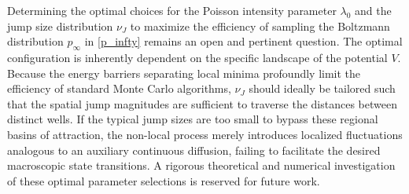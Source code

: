 \begin{remark}
    Determining the optimal choices for the Poisson intensity parameter $\lambda_0$ and the jump size distribution $\nu_J$ to maximize the efficiency of sampling the Boltzmann distribution $p_\infty$ in \eqref{p_infty} remains an open and pertinent question. The optimal configuration is inherently dependent on the specific landscape of the potential $V$. Because the energy barriers separating local minima profoundly limit the efficiency of standard Monte Carlo algorithms, $\nu_J$ should ideally be tailored such that the spatial jump magnitudes are sufficient to traverse the distances between distinct wells. If the typical jump sizes are too small to bypass these regional basins of attraction, the non-local process merely introduces localized fluctuations analogous to an auxiliary continuous diffusion, failing to facilitate the desired macroscopic state transitions. A rigorous theoretical and numerical investigation of these optimal parameter selections is reserved for future work.
\end{remark}



